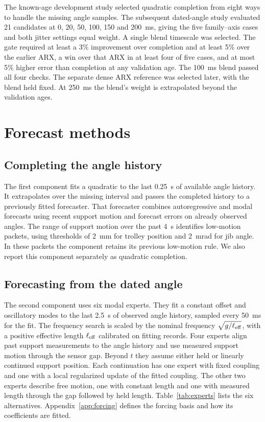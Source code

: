 The known-age development study selected quadratic completion from eight ways to handle the missing angle samples. The subsequent dated-angle study evaluated 21 candidates at 0, 20, 50, 100, 150 and 200~ms, giving the five family--axis cases and both jitter settings equal weight. A single blend timescale was selected. The gate required at least a 3\% improvement over completion and at least 5\% over the earlier ARX, a win over that ARX in at least four of five cases, and at most 5\% higher error than completion at any validation age. The 100~ms blend passed all four checks. The separate dense ARX reference was selected later, with the blend held fixed. At 250~ms the blend's weight is extrapolated beyond the validation ages.

\section{Forecast methods}

\subsection{Completing the angle history}

The first component fits a quadratic to the last 0.25~s of available angle history. It extrapolates over the missing interval and passes the completed history to a previously fitted forecaster. That forecaster combines autoregressive and modal forecasts using recent support motion and forecast errors on already observed angles. The range of support motion over the past 4~s identifies low-motion packets, using thresholds of 2~mm for trolley position and 2~mrad for jib angle. In these packets the component retains its previous low-motion rule. We also report this component separately as quadratic completion.

\subsection{Forecasting from the dated angle}

The second component uses six modal experts. They fit a constant offset and oscillatory modes to the last 2.5~s of observed angle history, sampled every 50~ms for the fit. The frequency search is scaled by the nominal frequency $\sqrt{g/\ell_{\rm eff}}$, with a positive effective length $\ell_{\rm eff}$ calibrated on fitting records. Four experts align past support measurements to the angle history and use measured support motion through the sensor gap. Beyond $t$ they assume either held or linearly continued support position. Each continuation has one expert with fixed coupling and one with a local regularized update of the fitted coupling. The other two experts describe free motion, one with constant length and one with measured length through the gap followed by held length. Table~\ref{tab:experts} lists the six alternatives. Appendix~\ref{app:forcing} defines the forcing basis and how its coefficients are fitted.

